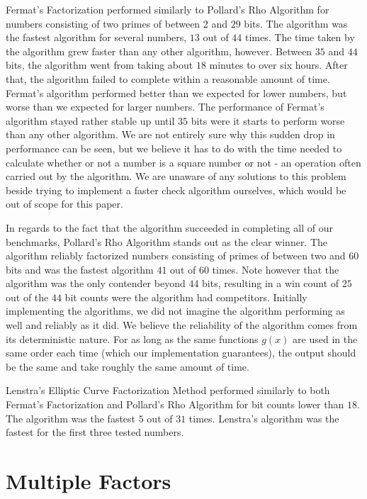 Fermat's Factorization performed similarly to Pollard's Rho Algorithm for numbers consisting of two primes of between 2 and $29$ bits. The algorithm was the fastest algorithm for several numbers, $13$ out of $44$ times. The time taken by the algorithm grew faster than any other algorithm, however. Between $35$ and $44$ bits, the algorithm went from taking about $18$ minutes to over six hours. After that, the algorithm failed to complete within a reasonable amount of time. Fermat's algorithm performed better than we expected for lower numbers, but worse than we expected for larger numbers. The performance of Fermat's algorithm stayed rather stable up until $35$ bits were it starts to perform worse than any other algorithm. We are not entirely sure why this sudden drop in performance can be seen, but we believe it has to do with the time needed to calculate whether or not a number is a square number or not - an operation often carried out by the algorithm. We are unaware of any solutions to this problem beside trying to implement a faster check algorithm ourselves, which would be out of scope for this paper.

In regards to the fact that the algorithm succeeded in completing all of our benchmarks, Pollard's Rho Algorithm stands out as the clear winner. The algorithm reliably factorized numbers consisting of primes of between two and $60$ bits and was the fastest algorithm $41$ out of $60$ times. Note however that the algorithm was the only contender beyond $44$ bits, resulting in a win count of $25$ out of the $44$ bit counts were the algorithm had competitors. Initially implementing the algorithms, we did not imagine the algorithm performing as well and reliably as it did. We believe the reliability of the algorithm comes from its deterministic nature. For as long as the same functions $g(x)$ are used in the same order each time (which our implementation guarantees), the output should be the same and take roughly the same amount of time.

Lenstra's Elliptic Curve Factorization Method performed similarly to both Fermat's Factorization and Pollard's Rho Algorithm for bit counts lower than $18$. The algorithm was the fastest $5$ out of $31$ times. Lenstra's algorithm was the fastest for the first three tested numbers.

\section{Multiple Factors}

